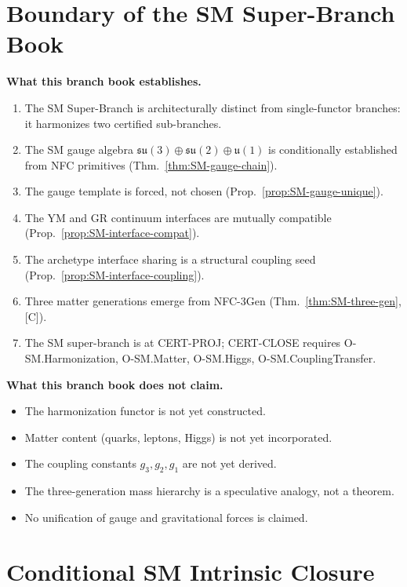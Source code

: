 \documentclass[12pt,oneside]{amsbook}
\theoremstyle{plain}
\theoremstyle{definition}
\theoremstyle{remark}
\begin{document}
\section{Boundary of the SM Super-Branch Book}

\textbf{What this branch book establishes.}
\begin{enumerate}
 \item The SM Super-Branch is architecturally distinct from single-functor
 branches: it harmonizes two certified sub-branches.
 \item The SM gauge algebra $\mathfrak{su}(3)\oplus\mathfrak{su}(2)\oplus\mathfrak{u}(1)$
 is conditionally established from NFC primitives (Thm.~\ref{thm:SM-gauge-chain}).
 \item The gauge template is forced, not chosen (Prop.~\ref{prop:SM-gauge-unique}).
 \item The YM and GR continuum interfaces are mutually compatible
 (Prop.~\ref{prop:SM-interface-compat}).
 \item The archetype interface sharing is a structural coupling seed
 (Prop.~\ref{prop:SM-interface-coupling}).
 \item Three matter generations emerge from NFC-3Gen
 (Thm.~\ref{thm:SM-three-gen}, [C]).
 \item The SM super-branch is at CERT-PROJ; CERT-CLOSE requires
 O-SM.Harmonization, O-SM.Matter, O-SM.Higgs, O-SM.CouplingTransfer.
\end{enumerate}

\textbf{What this branch book does not claim.}
\begin{itemize}
 \item The harmonization functor is not yet constructed.
 \item Matter content (quarks, leptons, Higgs) is not yet incorporated.
 \item The coupling constants $g_3, g_2, g_1$ are not yet derived.
 \item The three-generation mass hierarchy is a speculative analogy, not a theorem.
 \item No unification of gauge and gravitational forces is claimed.
\end{itemize}



\section{Conditional SM Intrinsic Closure}\label{sec:sm-intrinsic-closure}
\end{document}
